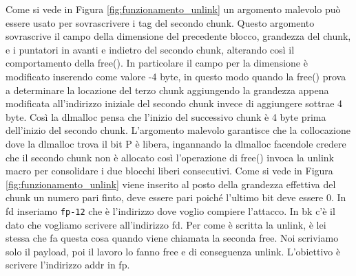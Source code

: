 Come si vede in Figura \ref{fig:funzionamento_unlink} un argomento malevolo può essere
usato per sovrascrivere i tag del secondo chunk. Questo argomento sovrascrive il
campo della dimensione del precedente blocco, grandezza del chunk, e i puntatori in
avanti e indietro del secondo chunk, alterando così il comportamento della free().
In particolare il campo per la dimensione è modificato inserendo come valore -4 byte,
in questo modo quando la free() prova a determinare la locazione del terzo chunk
aggiungendo la grandezza appena modificata all'indirizzo iniziale del secondo chunk
invece di aggiungere sottrae 4 byte. Così la dlmalloc pensa che l'inizio del successivo
chunk è 4 byte prima dell'inizio del secondo chunk. L'argomento malevolo garantisce
che la collocazione dove la dlmalloc trova il bit P è libera, ingannando la dlmalloc
facendole credere che il secondo chunk non è allocato così l'operazione di free()
invoca la unlink macro per consolidare i due blocchi liberi consecutivi. Come si vede
in Figura \ref{fig:funzionamento_unlink} viene inserito al posto della grandezza
effettiva del chunk un numero pari finto, deve essere pari poiché l'ultimo bit deve
essere 0.  In fd inseriamo \verb|fp-12| che è l'indirizzo dove voglio compiere l'attacco.
In bk c'è il dato che vogliamo scrivere all'indirizzo fd.
Per come è scritta la unlink, è lei stessa che fa questa cosa quando viene chiamata
la seconda free.
Noi scriviamo solo il payload, poi il lavoro lo fanno free e di conseguenza unlink.
L'obiettivo è scrivere l'indirizzo addr in fp.

